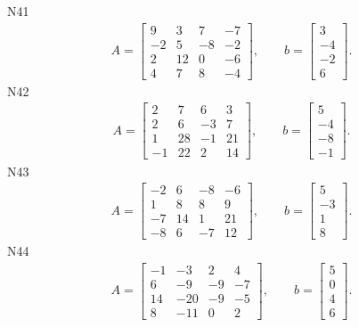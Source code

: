 \documentclass[11pt]{report}
\begin{document}
N41
\begin{align*}
 A = \left[\begin{matrix}9 & 3 & 7 & -7\\-2 & 5 & -8 & -2\\2 & 12 & 0 & -6\\4 & 7 & 8 & -4\end{matrix}\right],
\qquad b = \left[\begin{matrix}3\\-4\\-2\\6\end{matrix}\right]. 
 \end{align*}
N42
\begin{align*}
 A = \left[\begin{matrix}2 & 7 & 6 & 3\\2 & 6 & -3 & 7\\1 & 28 & -1 & 21\\-1 & 22 & 2 & 14\end{matrix}\right],
\qquad b = \left[\begin{matrix}5\\-4\\-8\\-1\end{matrix}\right]. 
 \end{align*}
N43
\begin{align*}
 A = \left[\begin{matrix}-2 & 6 & -8 & -6\\1 & 8 & 8 & 9\\-7 & 14 & 1 & 21\\-8 & 6 & -7 & 12\end{matrix}\right],
\qquad b = \left[\begin{matrix}5\\-3\\1\\8\end{matrix}\right]. 
 \end{align*}
N44
\begin{align*}
 A = \left[\begin{matrix}-1 & -3 & 2 & 4\\6 & -9 & -9 & -7\\14 & -20 & -9 & -5\\8 & -11 & 0 & 2\end{matrix}\right],
\qquad b = \left[\begin{matrix}5\\0\\4\\6\end{matrix}\right]. 
 \end{align*}
\end{document}
